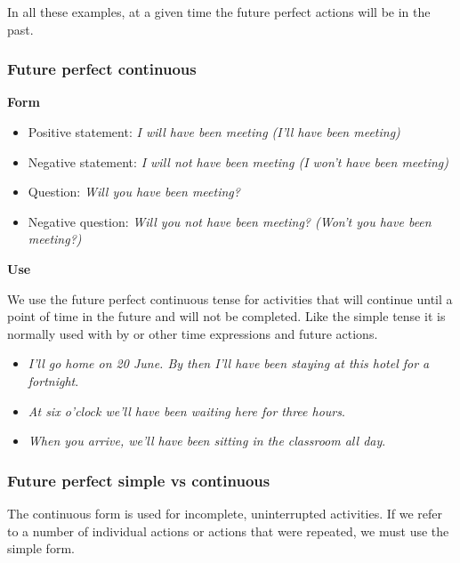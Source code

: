 In all these examples, at a given time the future perfect actions will be in the past. 

\subsubsection{Future perfect continuous}

\textbf{Form}

\begin{itemize}

\item Positive statement: \textit{I will have been meeting (I'll have been  meeting)}
\item Negative statement: \textit{I will not have been meeting (I won't have been meeting)}
\item Question: \textit{Will you have been meeting?}
\item Negative question: \textit{Will you not have been meeting? (Won't you have been meeting?)}

\end{itemize}

\textbf{Use}

We use the future perfect continuous tense for activities that will continue until a point of time in the future and will not be completed. Like the simple tense it is normally used with by or other time expressions and future actions. 

\begin{itemize}

\item \textit{I'll go home on 20 June. By then I'll have been staying at this hotel for a fortnight}.
\item \textit{At six o'clock we'll have been waiting here for three hours}.
\item \textit{When you arrive, we'll have been sitting in the classroom all day}.

\end{itemize}

\subsubsection{Future perfect simple vs continuous}

The continuous form is used for incomplete, uninterrupted activities. If we refer to a number of individual actions or actions that were repeated, we must use the simple form.

